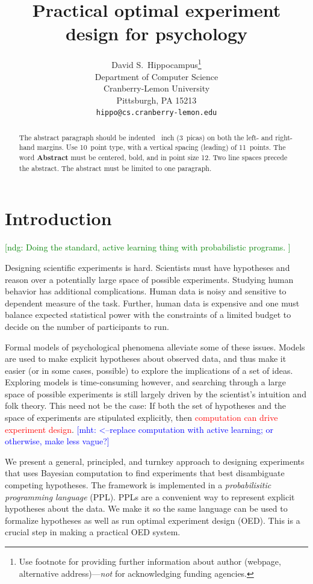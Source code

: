 \documentclass{article}
\title{Practical optimal experiment design for psychology}
\author{
  David S.~Hippocampus\thanks{Use footnote for providing further
    information about author (webpage, alternative
    address)---\emph{not} for acknowledging funding agencies.} \\
  Department of Computer Science\\
  Cranberry-Lemon University\\
  Pittsburgh, PA 15213 \\
  \texttt{hippo@cs.cranberry-lemon.edu} \\
}
\newcommand{\red}[1]{\textcolor{Red}{#1}}
\newcommand{\ndg}[1]{\textcolor{Green}{[ndg: #1]}}
\newcommand{\mht}[1]{\textcolor{Blue}{[mht: #1]}}
\begin{document}

\maketitle

\begin{abstract}
  The abstract paragraph should be indented ~inch
  (3~picas) on both the left- and right-hand margins. Use 10~point
  type, with a vertical spacing (leading) of 11~points.  The word
  \textbf{Abstract} must be centered, bold, and in point size 12. Two
  line spaces precede the abstract. The abstract must be limited to
  one paragraph.
\end{abstract}

\section{Introduction}
\ndg{Doing the standard, active learning thing with probabilistic programs. }

Designing scientific experiments is hard.
Scientists must have hypotheses and reason over a potentially large space of possible experiments.
Studying human behavior has additional complications.
Human data is noisy and sensitive to dependent measure of the task. 
Further, human data is expensive and one must balance expected statistical power with the constraints of a limited budget to decide on the number of participants to run.

Formal models of psychological phenomena alleviate some of these issues.
Models are used to make explicit hypotheses about observed data, and thus make it easier (or in some cases, possible) to explore the implications of a set of ideas.
Exploring models is time-consuming however, and searching through a large space of possible experiments is still largely driven by the scientist's intuition and folk theory.
This need not be the case: If both the set of hypotheses and the space of experiments are stipulated explicitly, then \red{computation can drive experiment design}. \mht{<--replace computation with active learning; or otherwise, make less vague?}

We present a general, principled, and turnkey approach to designing experiments that uses Bayesian computation to find experiments that
best disambiguate competing hypotheses.
The framework is implemented in a \emph{probabilisitic programming language} (PPL). 
PPLs are a convenient way to represent explicit hypotheses about the data. 
We make it so the same language can be used to formalize hypotheses as well as run optimal experiment design (OED). 
This is a crucial step in making a practical OED system.
\end{document}
